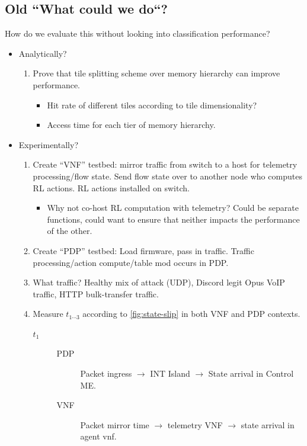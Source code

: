 \documentclass[sigconf,natbib=false]{acmart}
\begin{document}
\begin{appendices}
	\section{Old ``What could we do``?}
	How do we evaluate this without looking into classification performance?
	\begin{itemize}
		\item Analytically?
		\begin{enumerate}
			\item Prove that tile splitting scheme over memory hierarchy can improve performance.
			\begin{itemize}
				\item Hit rate of different tiles according to tile dimensionality?
				\item Access time for each tier of memory hierarchy.
			\end{itemize}
		\end{enumerate}
		\item Experimentally?
		\begin{enumerate}
			\item Create ``VNF'' testbed: mirror traffic from switch to a host for telemetry processing/flow state. Send flow state over to another node who computes RL actions. RL actions installed on switch.
			\begin{itemize}
				\item Why not co-host RL computation with telemetry? Could be separate functions, could want to ensure that neither impacts the performance of the other.
			\end{itemize}
			\item Create ``PDP'' testbed: Load firmware, pass in traffic. Traffic processing/action compute/table mod occurs in PDP.
			\item What traffic? Healthy mix of attack (UDP), Discord legit Opus VoIP traffic, HTTP bulk-transfer traffic.
			\item Measure $t_{1 \cdots 3}$ according to \cref{fig:state-slip} in both VNF and PDP contexts.
			\begin{description}
				\item[$t_1$]
				\begin{description}
					\item[PDP] Packet ingress $\rightarrow$ INT Island $\rightarrow$ State arrival in Control ME.
					\item[VNF] Packet mirror time $\rightarrow$ telemetry VNF $\rightarrow$ state arrival in agent vnf.
				\end{description}
				

\end{description}
\end{enumerate}
\end{itemize}
\end{appendices}
\end{document}
